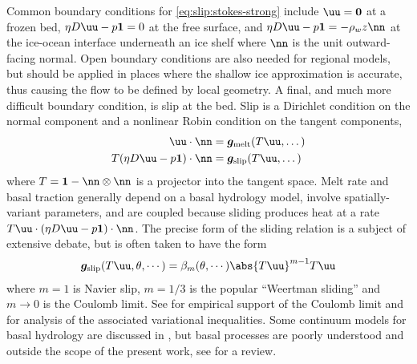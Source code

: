 Common boundary conditions for \eqref{eq:slip:stokes-strong} include $\uu = \bm 0$ at a frozen bed, $\eta D\uu - p\bm 1 = 0$ at the free surface, and $\eta D\uu - p\bm 1 = -\rho_w z \nn$ at the ice-ocean interface underneath an ice shelf where $\nn$ is the unit outward-facing normal.
Open boundary conditions are also needed for regional models, but should be applied in places where the shallow ice approximation is accurate, thus causing the flow to be defined by local geometry.
A final, and much more difficult boundary condition, is slip at the bed.
Slip is a Dirichlet condition on the normal component and a nonlinear Robin condition on the tangent components,
\begin{subequations}\label{eq:slip:bcstrong}
  \begin{align}
    \uu\cdot\nn &= \bm g_{\text{melt}}(T\uu,\dotsc) \\
    T (\eta D\uu - p\bm 1)\cdot\nn &= \bm g_{\text{slip}}(T \uu,\dotsc)
  \end{align}
\end{subequations}
where $T = \bm 1 - \nn\otimes\nn$ is a projector into the tangent space.
Melt rate and basal traction generally depend on a basal hydrology model, involve spatially-variant parameters, and are coupled because sliding produces heat at a rate $T\uu\cdot(\eta D\uu - p\bm 1)\cdot\nn$.
The precise form of the sliding relation is a subject of extensive debate, but is often taken to have the form
\begin{gather*}
  \bm g_{\text{slip}}(T\uu,\theta,\cdots) = \beta_m(\theta,\cdots) \abs{T\uu}^{m-1} T\uu
\end{gather*}
where $m=1$ is Navier slip, $m=1/3$ is the popular ``Weertman sliding'' \citep{weertman1957sliding} and $m\to 0$ is the Coulomb limit.
See \citet{iverson1998ring} for empirical support of the Coulomb limit and \citet{schoof2006variational,schoof2006plastic,schoof2007isg} for analysis of the associated variational inequalities.
Some continuum models for basal hydrology are discussed in \citet{flowers2002multicomponent1,flowers2002multicomponent2,johnson2002nhg}, but basal processes are poorly understood and outside the scope of the present work, see \citet{clarke2004subglacial} for a review.

